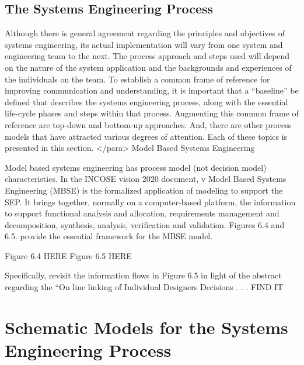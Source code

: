 \subsection{The Systems Engineering Process}

Although there is general agreement regarding the principles and objectives of systems engineering, its actual implementation will vary from one system and engineering team to the next. The process approach and steps used will depend on the nature of the system application and the backgrounds and experiences of the individuals on the team. To establish a common frame of reference for improving communication and understanding, it is important that a “baseline” be defined that describes the systems engineering process, along with the essential life-cycle phases and steps within that process. Augmenting this common frame of reference are top-down and bottom-up approaches. And, there are other process models that have attracted various degrees of attention. Each of these topics is presented in this section.
</para>
Model Based Systems Engineering

Model based systems engineering has process model (not decision model) characteristics. In the INCOSE vision 2020 document, v Model Based Systems Engineering (MBSE) is the formalized application of modeling to support the SEP. It brings together, normally on a computer-based platform, the information to support functional analysis and allocation, requirements management and decomposition, synthesis, analysis, verification and validation. Figures 6.4 and 6.5. provide the essential framework for the MBSE model.

Figure 6.4 HERE
Figure 6.5 HERE
	
Specifically, revisit the information flows in Figure 6.5 in light of the abstract regarding the “On line linking of Individual Designers Decisions . . . FIND IT


\section{Schematic Models for the Systems Engineering Process}

